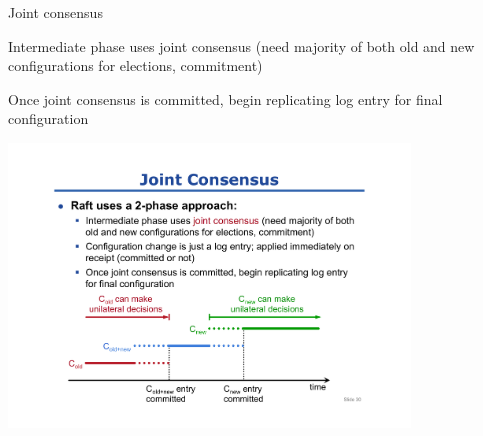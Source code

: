 \begin{frame}{Joint consensus}
\BIL
\item Intermediate phase uses joint consensus (need majority of both old and new configurations for elections, commitment)
\item Once joint consensus is committed, begin replicating log entry for final configuration
\EIL

\begin{center}
\includegraphics[width=0.8\textwidth]{joint-consensus}
\end{center}

\end{frame}



\begin{RMFrame}

\BI
\item {}
\EI

\end{RMFrame}




\begin{frame}{}
\end{frame}

